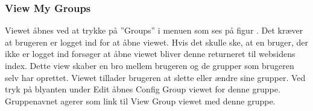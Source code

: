 \subsubsection{View My Groups}
Viewet åbnes ved at trykke på ''Groups'' i menuen som ses på figur . Det kræver at brugeren er logget ind for at åbne viewet. Hvis det skulle ske, at en bruger, der ikke er logget ind forsøger at åbne viewet bliver denne returneret til websidens index.
Dette view skaber en bro mellem brugeren og de grupper som brugeren selv har oprettet. Viewet tillader brugeren at slette eller ændre sine grupper. Ved tryk på blyanten under Edit åbnes Config Group viewet for denne gruppe. Gruppenavnet agerer som link til View Group viewet med denne gruppe. 